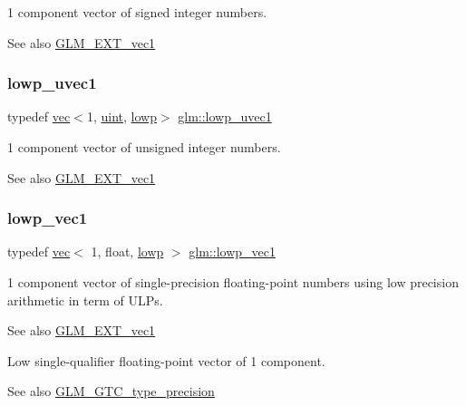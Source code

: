 1 component vector of signed integer numbers.

\begin{DoxySeeAlso}{See also}
\hyperlink{group__ext__vec1}{G\+L\+M\+\_\+\+E\+X\+T\+\_\+vec1} 
\end{DoxySeeAlso}
\mbox{\label{group__ext__vec1_gaa8d9fb78600ac97161b79c2e83f5a30f}} 
\subsubsection{\texorpdfstring{lowp\+\_\+uvec1}{lowp\_uvec1}}
{\footnotesize\ttfamily typedef \hyperlink{structglm_1_1vec}{vec}$<$1, \hyperlink{group__core__precision_ga4fd29415871152bfb5abd588334147c8}{uint}, \hyperlink{namespaceglm_a36ed105b07c7746804d7fdc7cc90ff25ae161af3fc695e696ce3bf69f7332bc2d}{lowp}$>$ \hyperlink{group__ext__vec1_gaa8d9fb78600ac97161b79c2e83f5a30f}{glm\+::lowp\+\_\+uvec1}}

1 component vector of unsigned integer numbers.

\begin{DoxySeeAlso}{See also}
\hyperlink{group__ext__vec1}{G\+L\+M\+\_\+\+E\+X\+T\+\_\+vec1} 
\end{DoxySeeAlso}
\mbox{\label{group__ext__vec1_gac40fba97d9ffbd2b3146d913d4ebc811}} 
\subsubsection{\texorpdfstring{lowp\+\_\+vec1}{lowp\_vec1}}
{\footnotesize\ttfamily typedef \hyperlink{structglm_1_1vec}{vec}$<$ 1, float, \hyperlink{namespaceglm_a36ed105b07c7746804d7fdc7cc90ff25ae161af3fc695e696ce3bf69f7332bc2d}{lowp} $>$ \hyperlink{group__ext__vec1_gac40fba97d9ffbd2b3146d913d4ebc811}{glm\+::lowp\+\_\+vec1}}

1 component vector of single-\/precision floating-\/point numbers using low precision arithmetic in term of U\+L\+Ps.

\begin{DoxySeeAlso}{See also}
\hyperlink{group__ext__vec1}{G\+L\+M\+\_\+\+E\+X\+T\+\_\+vec1}
\end{DoxySeeAlso}
Low single-\/qualifier floating-\/point vector of 1 component. \begin{DoxySeeAlso}{See also}
\hyperlink{group__gtc__type__precision}{G\+L\+M\+\_\+\+G\+T\+C\+\_\+type\+\_\+precision} 
\end{DoxySeeAlso}
\mbox{\label{group__ext__vec1_ga1e19a89e380de140b1496a824d306155}} 
